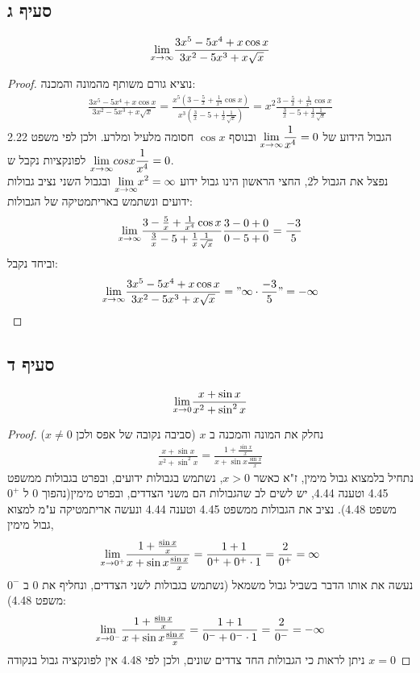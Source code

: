 \documentclass{article}
\begin{document}
	\subsection*{סעיף ג}
	\[ \displaystyle{\lim_{x \to \infty}} \frac{3x^5 - 5x^4 + x \cos x}{3x^2 - 5x^3 + x \sqrt{x}} \]
	\begin{proof}
		נוציא גורם משותף מהמונה והמכנה:
		\begin{align*}
			\frac{3x^5 - 5x^4 + x \cos x}{3x^2 - 5x^3 + x \sqrt{x}} =
			\frac{x^5(3 - \frac{5}{x} + \frac{1}{x^4}\cos x)}{x^3(\frac{3}{x} - 5 + \frac{1}{x}\frac{1}{\sqrt{x}})} =
			x^2\frac{3 - \frac{5}{x} + \frac{1}{x^4}\cos x}{\frac{3}{x} - 5 + \frac{1}{x}\frac{1}{\sqrt{x}}}
		\end{align*}
		הגבול הידוע של $\displaystyle{\lim_{x \to \infty}}\frac{1}{x^4}=0$ ובנוסף $\cos x$ חסומה מלעיל ומלרע. ולכן לפי משפט 2.22 לפונקציות נקבל ש $\displaystyle{\lim_{x \to \infty}}cos x \frac{1}{x^4} = 0$. \\
		נפצל את הגבול ל2, החצי הראשון הינו גבול ידוע $\displaystyle{\lim_{x \to \infty}}x^2 = \infty$ ובגבול השני נציב גבולות ידועים ונשתמש באריתמטיקה של הגבולות:
		\[
			\displaystyle{\lim_{x \to \infty}}
			\frac{3 - \frac{5}{x} + \frac{1}{x^4}\cos x}{\frac{3}{x} - 5 + \frac{1}{x}\frac{1}{\sqrt{x}}}
			\frac{3 - 0 + 0}{0 - 5 + 0} =
			\frac{-3}{5}
		\]
		וביחד נקבל:
		\[
			\displaystyle{\lim_{x \to \infty}} \frac{3x^5 - 5x^4 + x \cos x}{3x^2 - 5x^3 + x \sqrt{x}} =
			"\infty \cdot \frac{-3}{5}" = -\infty
		\]
	\end{proof}

	\subsection*{סעיף ד}
	\[ \displaystyle{\lim_{x \to 0}} \frac{x + \sin x}{x^2 + \sin^2 x} \]
	\begin{proof}
		נחלק את המונה והמכנה ב $x$ (סביבה נקובה של אפס ולכן $x \neq 0$)
		\begin{align*}
			\frac{x + \sin x}{x^2 + \sin^2 x} =
			\frac{1 + \frac{\sin x}{x}}{x + \sin x \frac{\sin x}{x}}
		\end{align*}
		נתחיל בלמצוא גבול מימין, ז"א כאשר $x > 0$, נשתמש בגבולות ידועים, ובפרט בגבולות ממשפט 4.45 וטענה 4.44, יש לשים לב שהגבולות הם משני הצדדים, ובפרט מימין(נהפוך $0$ ל $0^+$ משפט 4.48).
		נציב את הגבולות ממשפט 4.45 וטענה 4.44 ונעשה אריתמטיקה ע"מ למצוא גבול מימין,
		\begin{align*}
			\displaystyle{\lim_{x \to 0^+}}
			\frac{1 + \frac{\sin x}{x}}{x + \sin x \frac{\sin x}{x}}  =
			\frac{1 + 1}{0^+ + 0^+ \cdot 1}  = \frac{2}{0^+} = \infty
		\end{align*}
		נעשה את אותו הדבר בשביל גבול משמאל (נשתמש בגבולות לשני הצדדים, ונחליף את $0$ ב $0^-$ משפט 4.48):
		\begin{align*}
			\displaystyle{\lim_{x \to 0^-}}
			\frac{1 + \frac{\sin x}{x}}{x + \sin x \frac{\sin x}{x}}  =
			\frac{1 + 1}{0^- + 0^- \cdot 1}  = \frac{2}{0^-} = -\infty
		\end{align*}
		ניתן לראות כי הגבולות החד צדדים שונים, ולכן לפי 4.48 אין לפונקציה גבול בנקודה $x=0$
	\end{proof}
\end{document}
